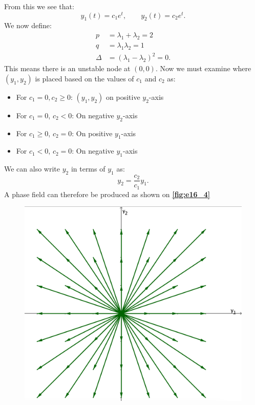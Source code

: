 From this we see that:
\[ 
y_1(t) = c_1 e^{t}, \qquad y_2(t) = c_2 e^{t}
.\]
We now define:
\begin{align*}
  p &= \lambda_1 + \lambda_2 = 2 \\
  q &= \lambda_1 \lambda_2 = 1 \\
  \Delta &= \left( \lambda_1 - \lambda_2 \right)^2 = 0
.\end{align*}
This means there is an unstable node at $(0,0)$. Now we must examine where $\left( y_1, y_2 \right)$ is placed based on the values of $c_1$ and $c_2$ as:
\begin{itemize}
  \item For $c_1 = 0, c_2 \geq 0$: $(y_1, y_2)$ on positive $y_2$-axis
  \item For $c_1 = 0$, $c_2 <0$: On negative $y_2$-axis
  \item For $c_1 \geq 0$, $c_2 = 0$: On positive $y_1$-axis
  \item For $c_1 < 0$, $c_2 = 0$: On negative $y_1$-axis
\end{itemize}
We can also write $y_2$ in terms of $y_1$ as:
\[ 
y_2 = \frac{c_2}{c_1} y_1
.\]
A phase field can therefore be produced as shown on \textbf{\autoref{fig:e16_4}}
\begin{figure} [ht]
  \centering
  \includegraphics[width=0.5\linewidth]{./figures/e16_4.png}
  \caption{}
  \label{fig:e16_4}
\end{figure}






